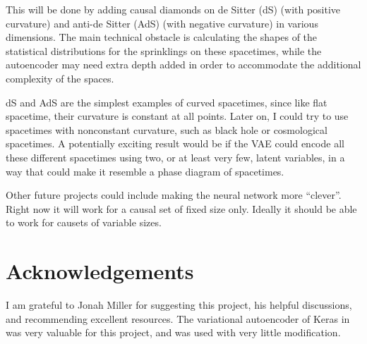 \documentclass[letterpaper,10pt]{article}
\begin{document}
This will be done by adding causal diamonds on de Sitter (dS) (with positive curvature) and anti-de Sitter (AdS) (with negative curvature) 
in various dimensions.  The main technical obstacle is calculating the 
shapes of the statistical distributions for the sprinklings on these spacetimes, while the autoencoder may need extra depth added in order to accommodate 
the additional complexity of the spaces.

dS and AdS are the simplest examples of curved spacetimes, since like flat spacetime, their curvature is constant at all points.  Later on, I could 
try to use spacetimes with nonconstant curvature, such as black hole or cosmological spacetimes.  A potentially exciting result would be if the VAE 
could encode all these different spacetimes using two, or at least very few, latent variables, in a way that could make it resemble a phase diagram of 
spacetimes.

Other future projects could include making the neural network more ``clever''.  Right now it will work for a causal set of fixed size only.  Ideally 
it should be able to work for causets of variable sizes.



\section{Acknowledgements}
I am grateful to Jonah Miller for suggesting this project, his helpful discussions, and recommending excellent resources.  
The variational autoencoder of Keras in \cite{kerasauto} was very valuable for this project, and was used with very little modification.
\end{document}
